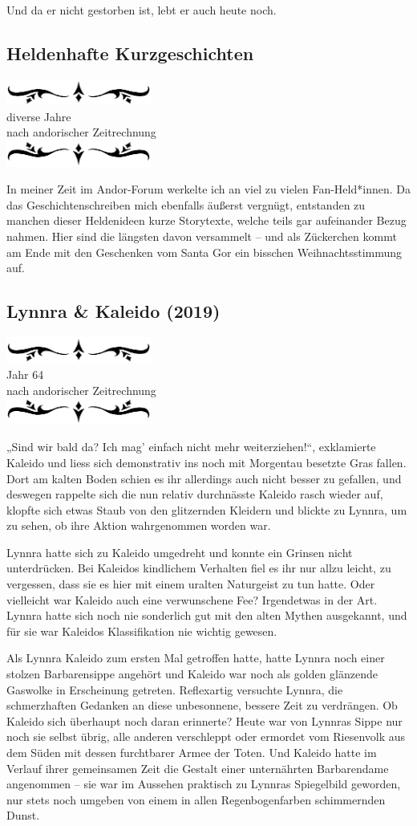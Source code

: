 \documentclass[10pt, a4paper, oneside]{book}
\newcommand{\az}[1]{%
    \begin{center}
        \includegraphics[width=180px]{Das Erbe des Wunderkindes/verzierung1.png}\\
        {\Huge #1} \\
        {nach andorischer Zeitrechnung}\\
        \includegraphics[width=180px]{Das Erbe des Wunderkindes/verzierung2.png}
    \end{center}
    \extramarks{}{#1 a.Z.}
}
\begin{document}
Und da er nicht gestorben ist, lebt er auch heute noch.



\begin{chapterbox}
    \chapter{Heldenhafte Kurzgeschichten}

    \az{diverse Jahre}

    In meiner Zeit im Andor-Forum werkelte ich an viel zu vielen Fan-Held*innen. Da das Geschichtenschreiben mich ebenfalls äußerst vergnügt, entstanden zu manchen dieser Heldenideen kurze Storytexte, welche teils gar aufeinander Bezug nahmen. Hier sind die längsten davon versammelt – und als Zückerchen kommt am Ende mit den Geschenken vom Santa Gor ein bisschen Weihnachtsstimmung auf.
\end{chapterbox}


\section{Lynnra \& Kaleido (2019)}

\az{Jahr 64}

„Sind wir bald da? Ich mag’ einfach nicht mehr weiterziehen!“, exklamierte Kaleido und liess sich demonstrativ ins noch mit Morgentau besetzte Gras fallen. Dort am kalten Boden schien es ihr allerdings auch nicht besser zu gefallen, und deswegen rappelte sich die nun relativ durchnässte Kaleido rasch wieder auf, klopfte sich etwas Staub von den glitzernden Kleidern und blickte zu Lynnra, um zu sehen, ob ihre Aktion wahrgenommen worden war.



Lynnra hatte sich zu Kaleido umgedreht und konnte ein Grinsen nicht unterdrücken. Bei Kaleidos kindlichem Verhalten fiel es ihr nur allzu leicht, zu vergessen, dass sie es hier mit einem uralten Naturgeist zu tun hatte. Oder vielleicht war Kaleido auch eine verwunschene Fee? Irgendetwas in der Art. Lynnra hatte sich noch nie sonderlich gut mit den alten Mythen ausgekannt, und für sie war Kaleidos Klassifikation nie wichtig gewesen.



Als Lynnra Kaleido zum ersten Mal getroffen hatte, hatte Lynnra noch einer stolzen Barbarensippe angehört und Kaleido war noch als golden glänzende Gaswolke in Erscheinung getreten. Reflexartig versuchte Lynnra, die schmerzhaften Gedanken an diese unbesonnene, bessere Zeit zu verdrängen. Ob Kaleido sich überhaupt noch daran erinnerte? Heute war von Lynnras Sippe nur noch sie selbst übrig, alle anderen verschleppt oder ermordet vom Riesenvolk aus dem Süden mit dessen furchtbarer Armee der Toten. Und Kaleido hatte im Verlauf ihrer gemeinsamen Zeit die Gestalt einer unternährten Barbarendame angenommen – sie war im Aussehen praktisch zu Lynnras Spiegelbild geworden, nur stets noch umgeben von einem in allen Regenbogenfarben schimmernden Dunst.
\end{document}
